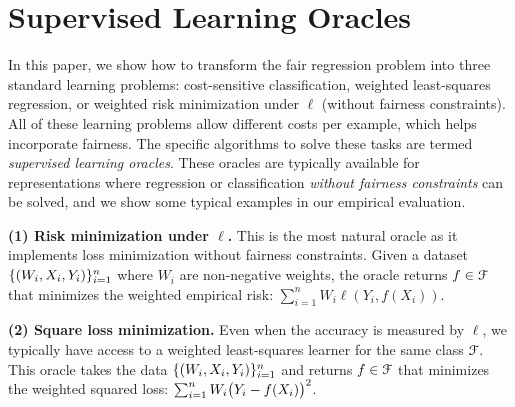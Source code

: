\documentclass{article}
\begin{document}

\section{Supervised Learning Oracles}
\label{sec:oracles}

In this paper, we show how to transform the fair regression problem into three standard learning problems: cost-sensitive classification, weighted least-squares regression, or weighted risk minimization under $\ell$ (without fairness constraints). All of these learning problems allow different costs per example, which helps incorporate fairness. The specific algorithms to solve these tasks are termed \emph{supervised learning oracles}. These oracles are typically available for representations where regression or classification \emph{without fairness constraints} can be solved, and we show some typical examples in our empirical evaluation.

\textbf{(1) Risk minimization under $\ell$.} This is the most natural oracle  as it implements loss minimization without fairness constraints. Given a dataset
    $\{(W_i,X_i,Y_i)\}_{i=1}^n$ where $W_i$ are non-negative weights, the oracle returns $f\in\mathcal{F}$ that minimizes the weighted empirical risk: $\sum_{i=1}^n W_i\ell(Y_i,f(X_i))$.


\textbf{(2) Square loss minimization.} Even when the accuracy is measured by $\ell$, we typically have access to a weighted least-squares learner for the same class $\mathcal{F}$. This oracle takes the data $\{(W_i,X_i,Y_i)\}_{i=1}^n$ and returns $f\in\mathcal{F}$ that minimizes the weighted squared loss: $\sum_{i=1}^n W_i \bigl(Y_i-f(X_i)\bigr)^2$.
\end{document}
